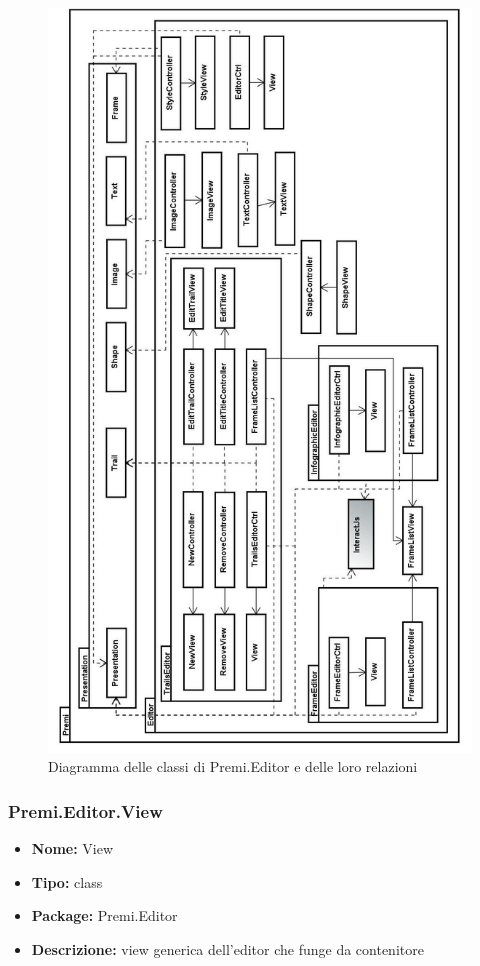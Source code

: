 \begin{figure}[h!]
\begin{center}
\includegraphics[scale=0.40]{img/diapkg/dettaglio_editor_presentation.jpg}
\caption{Diagramma delle classi di Premi.Editor e delle loro relazioni}
\end{center}
\end{figure}
\clearpage

\subsubsection{Premi.Editor.View}
\begin{itemize}
  \item \textbf{Nome:} View
  \item \textbf{Tipo:} class
  \item \textbf{Package:} Premi.Editor
  \item \textbf{Descrizione:} view generica dell'editor che funge da contenitore
\end{itemize}
